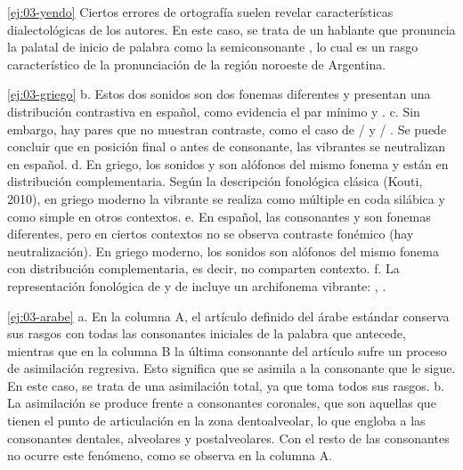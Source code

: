 \begin{solucion}{\ref{ej:03-yendo}}
Ciertos errores de ortografía suelen revelar características dialectológicas de
los autores. En este caso, se trata de un hablante que pronuncia la palatal de
inicio de palabra  como la semiconsonante , lo cual es un
rasgo característico de la pronunciación de la región noroeste de Argentina.
\end{solucion}

\begin{solucion}{\ref{ej:03-griego}}
b. Estos dos sonidos son dos fonemas diferentes y presentan una distribución
contrastiva en español, como evidencia el par mínimo  y .
c. Sin embargo, hay pares que no muestran contraste, como el caso de
 /  y  / . Se puede
concluir que en posición final o antes de consonante, las vibrantes se
neutralizan en español. d. En griego, los sonidos  y  son
alófonos del mismo fonema  y están en distribución complementaria.
Según la descripción fonológica clásica (Kouti, 2010), en griego moderno la vibrante se realiza como múltiple
en coda silábica y como simple en otros contextos. e. En español, las
consonantes  y  son fonemas diferentes, pero en ciertos contextos
no se observa contraste fonémico (hay neutralización). En griego moderno, los
sonidos son alófonos del mismo fonema con distribución complementaria, es
decir, no comparten contexto. f. La representación fonológica de
 y de  incluye un archifonema vibrante:
, .
\end{solucion}

\begin{solucion}{\ref{ej:03-arabe}}
a. En la columna A, el artículo definido  del árabe estándar
conserva sus rasgos con todas las consonantes iniciales de la palabra que
antecede, mientras que en la columna B la última consonante del artículo
 sufre un proceso de asimilación regresiva. Esto significa que se
asimila a la consonante que le sigue. En este caso, se trata de una asimilación
total, ya que toma todos sus rasgos. b. La asimilación se produce frente a
consonantes coronales, que son aquellas que tienen el punto de articulación en
la zona dentoalveolar, lo que engloba a las consonantes dentales, alveolares y
postalveolares. Con el resto de las consonantes no ocurre este fenómeno, como se
observa en la columna A.
\end{solucion}

